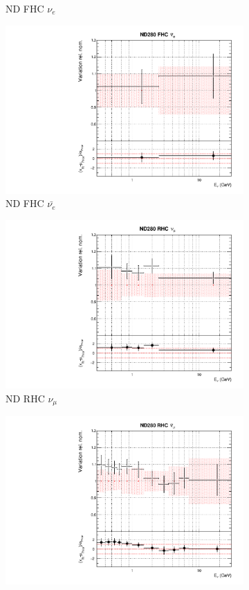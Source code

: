 \begin{figure}[!htbp]
\begin{subfigure}{0.45\textwidth}
  \caption{ND FHC $\nu_{e}$}
\end{subfigure}
\begin{subfigure}{0.45\textwidth}
  \centering
  \includegraphics[width=0.75\linewidth]{figs/datflux3}
  \caption{ND FHC $\bar{\nu_{e}}$}
\end{subfigure}
\begin{subfigure}{0.45\textwidth}
  \centering
  \includegraphics[width=0.75\linewidth]{figs/datflux4}
  \caption{ND RHC $\nu_{\mu}$}
\end{subfigure}
\begin{subfigure}{0.45\textwidth}
  \centering
  \includegraphics[width=0.75\linewidth]{figs/datflux5}

\end{subfigure}
\end{figure}

